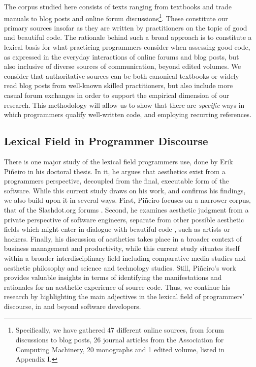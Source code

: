 The corpus studied here consists of texts ranging from textbooks and trade manuals to blog posts and online forum discussions\footnote{Specifically, we have gathered 47 different online sources, from forum discussions to blog posts, 26 journal articles from the Association for Computing Machinery, 20 monographs and 1 edited volume, listed in Appendix I.}. These constitute our primary sources insofar as they are written by practitioners on the topic of good and beautiful code. The rationale behind such a broad approach is to constitute a lexical basis for what practicing programmers consider when assessing good code, as expressed in the everyday interactions of online forums and blog posts, but also inclusive of diverse sources of communication, beyond edited volumes. We consider that authoritative sources can be both canonical textbooks or widely-read blog posts from well-known skilled practitioners, but also include more casual forum exchanges in order to support the empirical dimension of our research. This methodology will allow us to show that there are \emph{specific} ways in which programmers qualify well-written code, and employing recurring references.

\subsection{Lexical Field in Programmer Discourse}
\label{subsec:lexical-fields}

There is one major study of the lexical field programmers use, done by Erik Piñeiro in his doctoral thesis. In it, he argues that aesthetics exist from a programmers perspective, decoupled from the final, executable form of the software. While this current study draws on his work, and confirms his findings, we also build upon it in several ways. First, Piñeiro focuses on a narrower corpus, that of the Slashdot.org forums \citep{pineiro_aesthetics_2003}. Second, he examines aesthetic judgment from a private perspective of software engineers, separate from other possible aesthetic fields which might enter in dialogue with beautiful code \citep{pineiro_aesthetics_2003}, such as artists or hackers. Finally, his discussion of aesthetics takes place in a broader context of business management and productivity, while this current study situates itself within a broader interdisciplinary field including comparative media studies and aesthetic philosophy and science and technology studies. Still, Piñeiro's work provides valuable insights in terms of identifying the manifestations and rationales for an aesthetic experience of source code. Thus, we continue his research by highlighting the main adjectives in the lexical field of programmers' discourse, in and beyond software developers.

